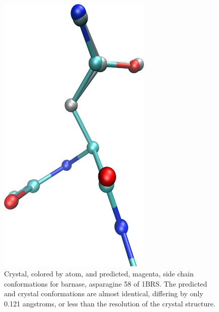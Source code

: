 \begin{figure}[h]
  \centering
  \includegraphics[width=0.65\textwidth,height=0.3\textheight,keepaspectratio]{figures/mutation_side_chain_images/1brs_chain_a_resid_58.png}
  \caption{Crystal, colored by atom, and predicted, magenta, side chain conformations for barnase, asparagine 58 of 1BRS.
The predicted and crystal conformations are almost identical, differing by only 0.121 angstroms, or less than the resolution of the crystal structure.}
  \label{figure:computational_mutation_scanning/1brs_a_58}
\end{figure}

